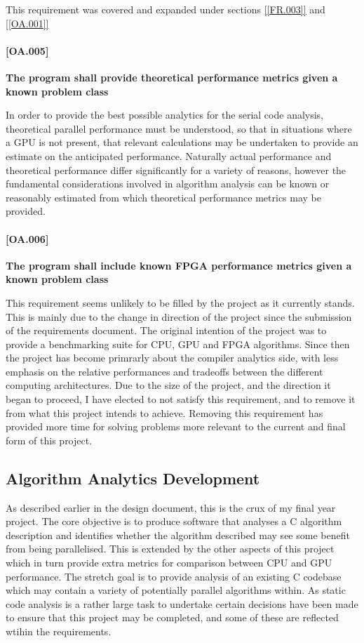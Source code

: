 This requirement was covered and expanded under sections \ref{[FR.003]} and \ref{[OA.001]}

\paragraph{[OA.005]} \label{[OA.005]}
\textbf{The program shall provide theoretical performance metrics given a known problem class}

In order to provide the best possible analytics for the serial code analysis, theoretical parallel performance must be understood, so that in situations where a GPU is not present, that relevant calculations may be undertaken to provide an estimate on the anticipated performance. Naturally actual performance and theoretical performance differ significantly for a variety of reasons, however the fundamental considerations involved in algorithm analysis can be known or reasonably estimated from which theoretical performance metrics may be provided.

\paragraph{[OA.006]}
\textbf{The program shall include known FPGA performance metrics given a known problem class}

This requirement seems unlikely to be filled by the project as it currently stands. This is mainly due to the change in direction of the project since the submission of the requirements document. The original intention of the project was to provide a benchmarking suite for CPU, GPU and FPGA algorithms. Since then the project has become primrarly about the compiler analytics side, with less emphasis on the relative performances and tradeoffs between the different computing architectures. Due to the size of the project, and the direction it began to proceed, I have elected to not satisfy this requirement, and to remove it from what this project intends to achieve. Removing this requirement has provided more time for solving problems more relevant to the current and final form of this project.


\subsection{Algorithm Analytics Development}
As described earlier in the design document, this is the crux of my final year project. The core objective is to produce software that analyses a C algorithm description and identifies whether the algorithm described may see some benefit from being parallelised. This is extended by the other aspects of this project which in turn provide extra metrics for comparison between CPU and GPU performance. The stretch goal is to provide analysis of an existing C codebase which may contain a variety of potentially parallel algorithms within. As static code analysis is a rather large task to undertake certain decisions have been made to ensure that this project may be completed, and some of these are reflected wtihin the requirements.

